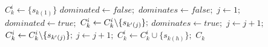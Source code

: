 \begin{algorithmic}[1] %
    \State $C_k^i \gets \{s_{k(1)}\}$
      \State $dominated \gets false;$
      \State $dominates \gets false;$
      \State $j \gets 1;$
          \State $dominated \gets true;$
          \State $C_k^i \gets C_k^i\backslash\{s_{{k'}(j)}\};$
          \State $dominates \gets true;$
        \EndIf
        \State $j \gets j + 1;$
      \EndWhile
            \State $C_k^i \gets C_k^i \backslash \{s_{{k'}(j)}\};$
          \EndIf
          \State $j \gets j + 1;$
        \EndWhile
        \State $C_k^i \gets C_k^i \cup \{s_{k(h)}\};$
      \EndIf
    \EndFor
  \State \Return $C_k$
  \EndFunction
\end{algorithmic}

